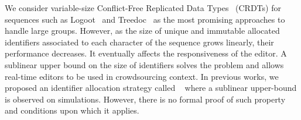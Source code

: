 We consider variable-size Conflict-Free Replicated Data
Types~\cite{shapiro2011comprehensive} (CRDTs) for sequences such as
Logoot~\cite{weiss2010logootundo} and Treedoc~\cite{preguica2009commutative} as the most promising
approaches to handle large groups. However, as the size of unique and
immutable allocated identifiers associated to each character of the
sequence grows linearly, their performance decreases. It eventually
affects the responsiveness of the editor. A sublinear upper bound on
the size of identifiers solves the problem and allows real-time
editors to be used in crowdsourcing context.  In previous works, we
proposed an identifier allocation strategy called
\LSEQ~\cite{nedelec2013concurrency, nedelec2013lseq} where a sublinear
upper-bound is observed on simulations. However, there is no formal
proof of such property and  conditions upon which it applies.




